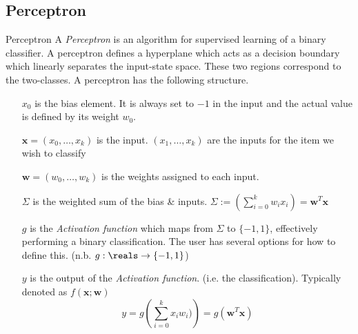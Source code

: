 \documentclass[11pt,a4paper]{article}
\begin{document}
\subsection{Perceptron}

\begin{definition}{Perceptron}
  A \textit{Perceptron} is an algorithm for supervised learning of a binary classifier. A perceptron defines a hyperplane which acts as a decision boundary which linearly separates the input-state space. These two regions correspond to the two-classes. A perceptron has the following structure.

  \begin{center}\end{center}
  \begin{itemize}
    \item[$x_0$] is the bias element. It is always set to $-1$ in the input and the actual value is defined by its weight $w_0$.
    \item[$\pmb{x}=(x_0,\dots,x_k)$] is the input. $(x_1,\dots,x_k)$ are the inputs for the item we wish to classify
    \item[$\pmb{w}=(w_0,\dots,w_k)$] is the weights assigned to each input.
    \item[$\Sigma$] is the weighted sum of the bias \& inputs. $\Sigma:=(\sum_{i=0}^kw_ix_i)=\pmb{w}^T\pmb{x}$
    \item[$g$] is the \textit{Activation function} which maps from $\Sigma$ to $\{-1,1\}$, effectively performing a binary classification. The user has several options for how to define this. (n.b. $g:\reals\to\{-1,1\}$)
    \item[$y$] is the output of the \textit{Activation function}. (i.e. the classification). Typically denoted as $f(\pmb{x};\pmb{w})$ \[ y=g\left(\sum_{i=0}^kx_iw_i)\right)=g(\pmb{w}^T\pmb{x})\]
  \end{itemize}
\end{definition}
\end{document}
